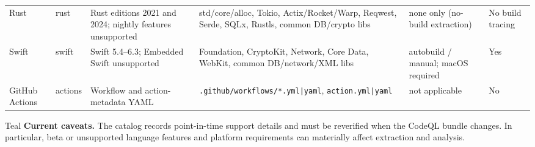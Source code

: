 \documentclass[10pt,letterpaper]{article}
\newcommand{\code}[1]{\begingroup\small\ttfamily\def\UrlFont{\ttfamily}\nolinkurl{#1}\endgroup}
\begin{document}
\begin{landscape}
\begin{longtable}{@{}P{0.72in}P{0.9in}P{1.45in}P{3.55in}P{1.25in}P{0.65in}@{}}
Rust & rust & Rust editions 2021 and 2024; nightly features unsupported & std/core/alloc, Tokio, Actix/Rocket/Warp, Reqwest, Serde, SQLx, Rustls, common DB/crypto libs & none only (no-build extraction) & No build tracing\\
Swift & swift & Swift 5.4--6.3; Embedded Swift unsupported & Foundation, CryptoKit, Network, Core Data, WebKit, common DB/network/XML libs & autobuild / manual; macOS required & Yes\\
GitHub Actions & actions & Workflow and action-metadata YAML & \code{.github/workflows/*.yml|yaml}, \code{action.yml|yaml} & not applicable & No\\
\bottomrule
\end{longtable}
\normalsize
\begin{callout}{Teal}
\textbf{Current caveats.} The catalog records point-in-time support details and must be reverified when the CodeQL bundle changes. In particular, beta or unsupported language features and platform requirements can materially affect extraction and analysis.
\end{callout}
\end{landscape}
\end{document}
